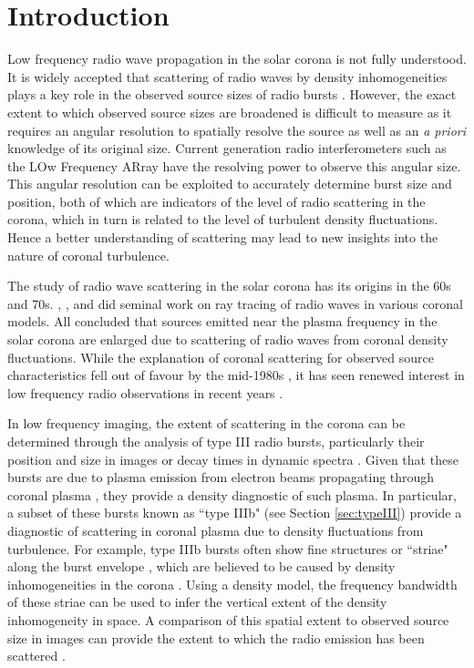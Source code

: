 \section{Introduction} \label{sec:intro}
Low frequency radio wave propagation in the solar corona is not fully understood. It is widely accepted that scattering of radio waves by density inhomogeneities plays a key role in the observed source sizes of radio bursts \citep{Fokker1965,Steinberg1971,Stewart1972,Riddle1974,Thejappa2007,Thejappa2008,Kontar2019}. However, the exact extent to which observed source sizes are broadened is difficult to measure as it requires an angular resolution to spatially resolve the source as well as an \textit{a priori} knowledge of its original size.
Current generation radio interferometers such as the LOw Frequency ARray \citep[LOFAR;][]{VanHaarlem2013} have the resolving power to observe this angular size. This angular resolution can be exploited to accurately determine burst size and position, both of which are indicators of the level of radio scattering in the corona, which in turn is related to the level of turbulent density fluctuations. Hence a better understanding of scattering may lead to new insights into the nature of coronal turbulence.

The study of radio wave scattering in the solar corona has its origins in the 60s and 70s. \cite{Fokker1965}, \cite{Steinberg1971}, \cite{Stewart1972} and \cite{Riddle1974} did seminal work on ray tracing of radio waves in various coronal models. All concluded that sources emitted near the plasma frequency in the solar corona are enlarged due to scattering of radio waves from coronal density fluctuations. While the explanation of coronal scattering for observed source characteristics fell out of favour by the mid-1980s \citep{McLean1985}, it has seen renewed interest in low frequency radio observations in recent years  \citep{Thejappa2007,Thejappa2008,Kontar2017,Sharykin2018,Gordovskyy2019,Kontar2019}.

In low frequency imaging, the extent of scattering in the corona can be determined through the analysis of type III radio bursts, particularly their position and size in images or decay times in dynamic spectra \citep[e.g.][]{Kontar2019, Gordovskyy2019, Krupar2018}. Given that these bursts are due to plasma emission from electron beams propagating through coronal plasma \citep[see][for a review]{Reid2014}, they provide a density diagnostic of such plasma. In particular, a subset of these bursts known as ``type IIIb" (see Section \ref{sec:typeIII}) provide a diagnostic of scattering in coronal plasma due to density fluctuations from turbulence. For example, type IIIb bursts often show fine structures or ``striae" along the burst envelope \citep{Ellis1967,Ellis1969,DeLaNoe1972,DeLaNoe1975,Melnik2010b}, which are believed to be caused by density inhomogeneities in the corona \citep{Takakura1975}. Using a density model, the frequency bandwidth of these striae can be used to infer the vertical extent of the density inhomogeneity in space. A comparison of this spatial extent to observed source size in images can provide the extent to which the radio emission has been scattered \citep[e.g.][]{Kontar2017}.


